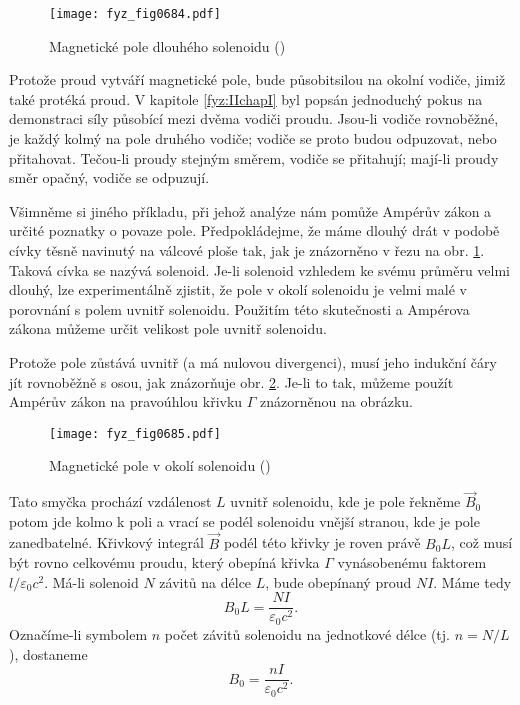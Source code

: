     \begin{figure}[ht!] %
      \centering
      \texttt{[image: fyz\_fig0684.pdf]}
      \caption{Magnetické pole dlouhého solenoidu
               (\cite[s.~707]{Feynman02})}
      \label{fyz:fig0684}
    \end{figure}

    Protože proud vytváří magnetické pole, bude působitsilou na okolní vodiče, jimiž také protéká
    proud. V kapitole \ref{fyz:IIchapI} byl popsán jednoduchý pokus na demonstraci síly působící
    mezi dvěma vodiči proudu. Jsou-li vodiče rovnoběžné, je každý kolmý na pole druhého vodiče;
    vodiče se proto budou odpuzovat, nebo přitahovat. Tečou-li proudy stejným směrem, vodiče se
    přitahují; mají-li proudy směr opačný, vodiče se odpuzují.

    Všimněme si jiného příkladu, při jehož analýze nám pomůže Ampérův zákon a určité poznatky o
    povaze pole. Předpokládejme, že máme dlouhý drát v podobě cívky těsně navinutý na válcové ploše
    tak, jak je znázorněno v řezu na obr. \ref{fyz:fig0684}. Taková cívka se nazývá solenoid. Je-li
    solenoid vzhledem ke svému průměru velmi dlouhý, lze experimentálně zjistit, že pole v okolí
    solenoidu je velmi malé v porovnání s polem uvnitř solenoidu. Použitím této skutečnosti a
    Ampérova zákona můžeme určit velikost pole uvnitř solenoidu.

    Protože pole zůstává uvnitř (a má nulovou divergenci), musí jeho indukční čáry jít rovnoběžně s
    osou, jak znázorňuje obr. \ref{fyz:fig0685}. Je-li to tak, můžeme použít Ampérův zákon na
    pravoúhlou křivku \(\Gamma\) znázorněnou na obrázku.

    \begin{figure}[ht!] %
      \centering
      \texttt{[image: fyz\_fig0685.pdf]}
      \caption{Magnetické pole v okolí solenoidu
               (\cite[s.~707]{Feynman02})}
      \label{fyz:fig0685}
    \end{figure}

    Tato smyčka prochází vzdálenost \(L\) uvnitř solenoidu, kde je pole řekněme \(\vec{B}_0\) potom
    jde kolmo k poli a vrací se podél solenoidu vnější stranou, kde je pole zanedbatelné. Křivkový
    integrál \(\vec{B}\) podél této křivky je roven právě \(B_0L\), což musí být rovno celkovému
    proudu, který obepíná křivka \(\Gamma\) vynásobenému faktorem \(l/\varepsilon_0c^2\). Má-li
    solenoid \(N\) závitů na délce \(L\), bude obepínaný proud \(NI\). Máme tedy
    \begin{equation*}
      B_0L = \dfrac{NI}{\varepsilon_0c^2}.
    \end{equation*}
    Označíme-li symbolem \(n\) počet závitů solenoidu na jednotkové délce (tj. \(n = N/L\)),
    dostaneme
    \begin{equation}\label{fyz:eq806}
      B_0 = \dfrac{nI}{\varepsilon_0c^2}.
    \end{equation}

